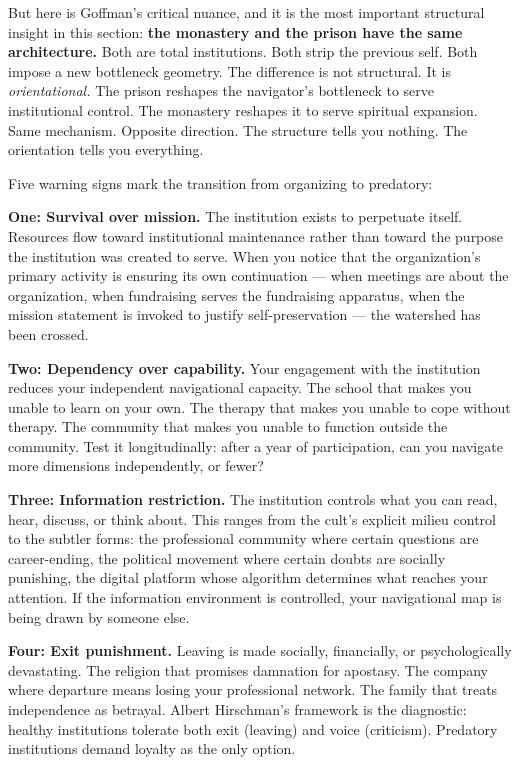 But here is Goffman's critical nuance, and it is the most important structural insight in this section: \textbf{the monastery and the prison have the same architecture.} Both are total institutions. Both strip the previous self. Both impose a new bottleneck geometry. The difference is not structural. It is \textit{orientational.} The prison reshapes the navigator's bottleneck to serve institutional control. The monastery reshapes it to serve spiritual expansion. Same mechanism. Opposite direction. The structure tells you nothing. The orientation tells you everything.


Five warning signs mark the transition from organizing to predatory:


\textbf{One: Survival over mission.} The institution exists to perpetuate itself. Resources flow toward institutional maintenance rather than toward the purpose the institution was created to serve. When you notice that the organization's primary activity is ensuring its own continuation — when meetings are about the organization, when fundraising serves the fundraising apparatus, when the mission statement is invoked to justify self-preservation — the watershed has been crossed.


\textbf{Two: Dependency over capability.} Your engagement with the institution reduces your independent navigational capacity. The school that makes you unable to learn on your own. The therapy that makes you unable to cope without therapy. The community that makes you unable to function outside the community. Test it longitudinally: after a year of participation, can you navigate more dimensions independently, or fewer?


\textbf{Three: Information restriction.} The institution controls what you can read, hear, discuss, or think about. This ranges from the cult's explicit milieu control to the subtler forms: the professional community where certain questions are career-ending, the political movement where certain doubts are socially punishing, the digital platform whose algorithm determines what reaches your attention. If the information environment is controlled, your navigational map is being drawn by someone else.


\textbf{Four: Exit punishment.} Leaving is made socially, financially, or psychologically devastating. The religion that promises damnation for apostasy. The company where departure means losing your professional network. The family that treats independence as betrayal. Albert Hirschman's framework is the diagnostic: healthy institutions tolerate both exit (leaving) and voice (criticism). Predatory institutions demand loyalty as the only option.



